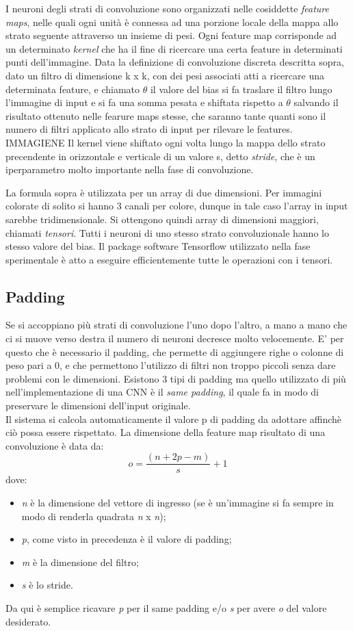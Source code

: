  I neuroni degli strati
  di convoluzione sono organizzati nelle cosiddette \emph{feature maps},
   nelle quali ogni unità è connessa ad una porzione locale della mappa allo strato 
   seguente attraverso un insieme di pesi. Ogni feature map corrisponde ad un determinato
    \emph{kernel} che ha il fine di ricercare una certa feature in determinati punti dell’immagine.  
Data la definizione di convoluzione discreta descritta sopra,
 dato un filtro di dimensione k x k, con dei pesi associati atti a ricercare una determinata feature,
  e chiamato \(\theta\) il valore del bias si fa traslare il filtro lungo l’immagine 
  di input e si fa una somma pesata e shiftata rispetto a \(\theta\) salvando il risultato ottenuto nelle fearure maps stesse, che
   saranno tante quanti sono il numero di filtri applicato allo strato di input per rilevare le features.
\\IMMAGIENE
Il kernel viene shiftato ogni volta lungo la mappa dello strato precendente in orizzontale e  verticale
 di un valore s, detto \emph{stride}, che è un iperparametro molto importante nella
  fase di convoluzione.

La formula sopra è utilizzata per un array di due dimensioni. Per immagini
 colorate di solito si hanno 3 canali per colore, dunque in tale caso l’array 
 in input sarebbe tridimensionale. Si ottengono quindi array di dimensioni maggiori, 
 chiamati \emph{tensori}.
Tutti i neuroni di uno stesso strato convoluzionale hanno lo stesso valore del bias. 
 Il package software Tensorflow utilizzato nella fase sperimentale è atto a eseguire 
 efficientemente tutte le operazioni con i tensori. 
\subsection{Padding}
Se si accoppiano più strati di convoluzione l’uno dopo l’altro, a mano a mano 
che ci si muove verso destra il numero di neuroni decresce molto velocemente. 
E’ per questo che è necessario il padding, che permette di aggiungere righe o
 colonne di peso pari a 0, e che permettono l’utilizzo di filtri non troppo piccoli 
 senza dare problemi con le dimensioni. Esistono 3 tipi di padding ma quello utilizzato
  di più nell’implementazione di una CNN è il \emph{same padding}, il quale fa in modo di
   preservare le dimensioni dell’input originale.\\
    Il sistema si calcola automaticamente il valore p di padding da adottare affinchè ciò 
    possa essere rispettato. 
La dimensione della feature map risultato di una convoluzione è data da:
$$ o = \frac{(n + 2p - m)}{s} + 1 $$ 
dove:
\begin{itemize}
     \item \emph{n} è la dimensione del vettore di ingresso (se è un’immagine si fa 
sempre in modo di renderla quadrata \emph{n} x \emph{n});
\item \emph{p}, come visto in precedenza è il valore di padding;
\item \emph{m} è la dimensione del filtro;
\item \emph{s} è lo stride.
\end{itemize}
Da qui è semplice ricavare \emph{p} per il same padding e/o \emph{s} per avere \emph{o} del valore desiderato.

